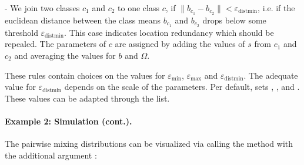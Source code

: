 \documentclass[article]{jss}
\newcommand{\fct}[1]{\code{#1()}}
\begin{document}
- We join two classes $c_1$ and $c_2$ to one class $c$, if $\lVert b_{c_1} - b_{c_2} \rVert<\varepsilon_{\text{distmin}}$, i.e. if the euclidean distance between the class means $b_{c_1}$ and $b_{c_2}$  drops below some threshold $\varepsilon_{\text{distmin}}$. This case indicates location redundancy which should be repealed. The parameters of $c$ are assigned by adding the values of $s$ from $c_1$ and $c_2$ and averaging the values for $b$ and $\Omega$.

These rules contain choices on the values for $\varepsilon_{\text{min}}$, $\varepsilon_{\text{max}}$ and $\varepsilon_{\text{distmin}}$. The adequate value for $\varepsilon_{\text{distmin}}$ depends on the scale of the parameters. Per default,  sets  , , and . These values can be adapted through the  list.

\paragraph{Example 2: Simulation (cont.).}

The pairwise mixing distributions can be visualized via calling the \fct{plot} method with the additional argument :
\end{document}
